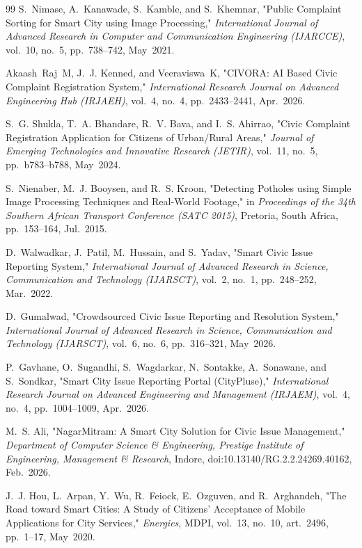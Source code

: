 \documentclass[12pt,a4paper]{report}
\begin{document}
\begin{thebibliography}{99}
S.~Nimase, A.~Kanawade, S.~Kamble, and S.~Khemnar, "Public Complaint Sorting for Smart City using Image Processing," \textit{International Journal of Advanced Research in Computer and Communication Engineering (IJARCCE)}, vol.~10, no.~5, pp.~738--742, May~2021.

Akaash~Raj~M, J.~J. Kenned, and Veeraviswa~K, "CIVORA: AI Based Civic Complaint Registration System," \textit{International Research Journal on Advanced Engineering Hub (IRJAEH)}, vol.~4, no.~4, pp.~2433--2441, Apr.~2026.

S.~G. Shukla, T.~A. Bhandare, R.~V. Bava, and I.~S. Ahirrao, "Civic Complaint Registration Application for Citizens of Urban/Rural Areas," \textit{Journal of Emerging Technologies and Innovative Research (JETIR)}, vol.~11, no.~5, pp.~b783--b788, May~2024.

S.~Nienaber, M.~J. Booysen, and R.~S. Kroon, "Detecting Potholes using Simple Image Processing Techniques and Real-World Footage," in \textit{Proceedings of the 34th Southern African Transport Conference (SATC 2015)}, Pretoria, South Africa, pp.~153--164, Jul.~2015.

D.~Walwadkar, J.~Patil, M.~Hussain, and S.~Yadav, "Smart Civic Issue Reporting System," \textit{International Journal of Advanced Research in Science, Communication and Technology (IJARSCT)}, vol.~2, no.~1, pp.~248--252, Mar.~2022.

D.~Gumalwad, "Crowdsourced Civic Issue Reporting and Resolution System," \textit{International Journal of Advanced Research in Science, Communication and Technology (IJARSCT)}, vol.~6, no.~6, pp.~316--321, May~2026.

P.~Gavhane, O.~Sugandhi, S.~Wagdarkar, N.~Sontakke, A.~Sonawane, and S.~Sondkar, "Smart City Issue Reporting Portal (CityPluse)," \textit{International Research Journal on Advanced Engineering and Management (IRJAEM)}, vol.~4, no.~4, pp.~1004--1009, Apr.~2026.

M.~S. Ali, "NagarMitram: A Smart City Solution for Civic Issue Management," \textit{Department of Computer Science \& Engineering, Prestige Institute of Engineering, Management \& Research}, Indore, doi:10.13140/RG.2.2.24269.40162, Feb.~2026.

J.~J. Hou, L.~Arpan, Y.~Wu, R.~Feiock, E.~Ozguven, and R.~Arghandeh, "The Road toward Smart Cities: A Study of Citizens' Acceptance of Mobile Applications for City Services," \textit{Energies}, MDPI, vol.~13, no.~10, art.~2496, pp.~1--17, May~2020.


\end{thebibliography}
\end{document}
